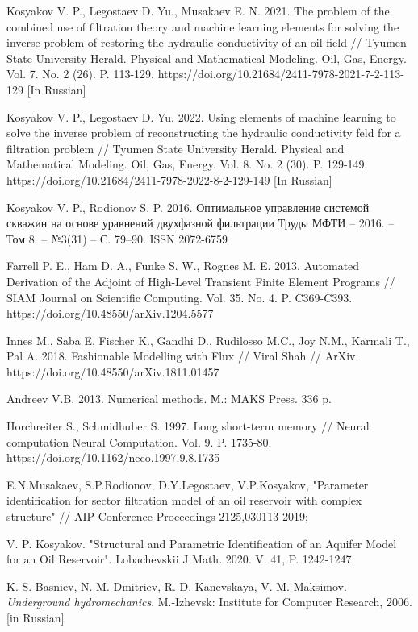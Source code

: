 \documentclass{article}
\begin{document}
\begin{thebibliography}{20}
 Kosyakov V. P., Legostaev D. Yu., Musakaev E. N. 2021. The problem of the combined use of filtration theory and machine learning elements for solving the inverse problem of restoring the hydraulic conductivity of an oil field // Tyumen State University Herald. Physical and Mathematical Modeling. Oil, Gas, Energy. Vol. 7. No. 2 (26). P. 113-129. https://doi.org/10.21684/2411-7978-2021-7-2-113-129 [In Russian]

 Kosyakov V. P., Legostaev D. Yu. 2022. Using elements of machine learning to solve the inverse problem of reconstructing the hydraulic conductivity feld for a filtration problem // Tyumen State University Herald. Physical and Mathematical Modeling. Oil, Gas, Energy. Vol. 8. No. 2 (30). P. 129-149. https://doi.org/10.21684/2411-7978-2022-8-2-129-149 [In Russian]

 Kosyakov V. P., Rodionov S. P. 2016. Оптимальное управление системой скважин на основе уравнений двухфазной фильтрации	Труды МФТИ – 2016. – Том 8. – №3(31) – С. 79–90. ISSN 2072-6759

 Farrell P. E., Ham D. A., Funke S. W., Rognes M. E. 2013. Automated Derivation of the Adjoint of High-Level Transient Finite Element Programs // SIAM Journal on Scientific Computing. Vol. 35. No. 4. P. C369-C393. https://doi.org/10.48550/arXiv.1204.5577

 Innes M.,  Saba E, Fischer K., Gandhi D., Rudilosso M.C., Joy N.M., Karmali T., Pal A. 2018. Fashionable Modelling with Flux // Viral Shah // ArXiv. https://doi.org/10.48550/arXiv.1811.01457 

 Andreev V.B. 2013. Numerical methods. М.: MAKS Press. 336 p.

 Horchreiter S., Schmidhuber S. 1997. Long short-term memory // Neural computation Neural Computation. Vol. 9. P. 1735-80. https://doi.org/10.1162/neco.1997.9.8.1735


 E.N.Musakaev, S.P.Rodionov, D.Y.Legostaev, V.P.Kosyakov, "Parameter identification for sector filtration model of an oil reservoir with complex structure" // AIP Conference Proceedings 2125,030113 2019;

 V. P. Kosyakov. "Structural and Parametric Identification of an Aquifer Model for an Oil Reservoir". Lobachevskii J Math. 2020. V. 41, P. 1242-1247.

 K. S. Basniev, N. M. Dmitriev, R. D. Kanevskaya, V. M. Maksimov. \textit{Underground hydromechanics}. M.-Izhevsk: Institute for Computer Research, 2006. [in Russian]


\end{thebibliography}
\end{document}

